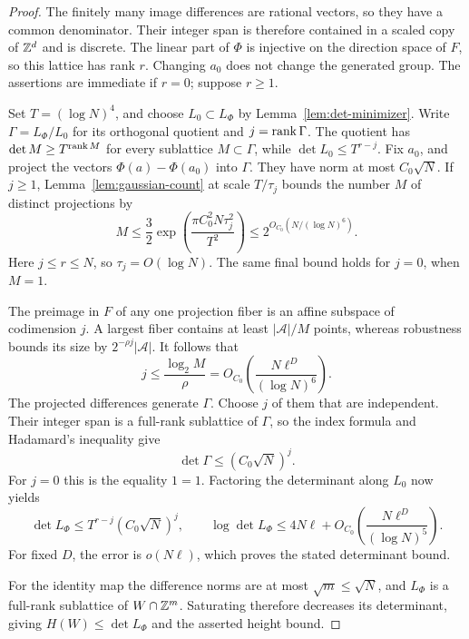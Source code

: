 \begin{proof}
The finitely many image differences are rational vectors, so they have
a common denominator. Their integer span is therefore contained in a
scaled copy of \(\mathbb Z^d\) and is discrete. The linear part of \(\Phi\) is
injective on the direction space of \(F\), so this lattice has rank
\(r\). Changing \(a_0\)
does not change the generated group. The assertions are immediate
if \(r=0\); suppose \(r\ge1\).

Set \(T=(\log N)^4\), and choose \(L_0\subset L_\Phi\) by
Lemma~\ref{lem:det-minimizer}. Write
\(\Gamma=L_\Phi/L_0\) for its orthogonal quotient and
\(j=\operatorname{rank}\Gamma\). The quotient has
\(\det M\ge T^{\operatorname{rank} M}\) for every sublattice \(M\subset\Gamma\),
while
\(\det L_0\le T^{r-j}\). Fix \(a_0\), and project the vectors
\(\Phi(a)-\Phi(a_0)\) into \(\Gamma\). They have norm at most
\(C_0\sqrt N\). If \(j\ge1\), Lemma~\ref{lem:gaussian-count} at
scale \(T/\tau_j\) bounds the number \(M\) of distinct projections by
\[
 M\le\frac32
     \exp\!\left(\frac{\pi C_0^2N\tau_j^2}{T^2}\right)
 \le 2^{O_{C_0}(N/(\log N)^6)}.
\]
Here \(j\le r\le N\), so \(\tau_j=O(\log N)\). The same final
bound holds for \(j=0\), when \(M=1\).

The preimage in \(F\) of any one projection fiber is an affine
subspace of codimension \(j\). A largest fiber contains at least
\(|\mathcal A|/M\) points, whereas robustness bounds its size by
\(2^{-\rho j}|\mathcal A|\). It follows that
\[
 j\le\frac{\log_2 M}{\rho}
   =O_{C_0}\!\left(\frac{N\ell^D}{(\log N)^6}\right).
\]
The projected differences generate \(\Gamma\). Choose \(j\) of
them that are independent. Their integer span is a full-rank
sublattice of \(\Gamma\), so the index formula and Hadamard's
inequality give
\[
 \det\Gamma\le (C_0\sqrt N)^j.
\]
For \(j=0\) this is the equality \(1=1\). Factoring the determinant
along \(L_0\) now yields
\[
 \det L_\Phi
 \le T^{r-j}(C_0\sqrt N)^j,
 \qquad
 \log\det L_\Phi
 \le 4N\ell+
     O_{C_0}\!\left(\frac{N\ell^D}{(\log N)^5}\right).
\]
For fixed \(D\), the error is \(o(N\ell)\), which proves the stated
determinant bound.

For the identity map the difference norms are at most
\(\sqrt m\le\sqrt N\), and \(L_\Phi\) is a full-rank sublattice
of \(W\cap\mathbb Z^m\). Saturating therefore decreases its determinant,
giving \(H(W)\le\det L_\Phi\) and the asserted height bound.
\end{proof}
